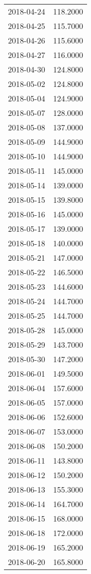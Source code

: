 \begin{tabular}{lr}
2018-04-24 &    118.2000 \\
2018-04-25 &    115.7000 \\
2018-04-26 &    115.6000 \\
2018-04-27 &    116.0000 \\
2018-04-30 &    124.8000 \\
2018-05-02 &    124.8000 \\
2018-05-04 &    124.9000 \\
2018-05-07 &    128.0000 \\
2018-05-08 &    137.0000 \\
2018-05-09 &    144.9000 \\
2018-05-10 &    144.9000 \\
2018-05-11 &    145.0000 \\
2018-05-14 &    139.0000 \\
2018-05-15 &    139.8000 \\
2018-05-16 &    145.0000 \\
2018-05-17 &    139.0000 \\
2018-05-18 &    140.0000 \\
2018-05-21 &    147.0000 \\
2018-05-22 &    146.5000 \\
2018-05-23 &    144.6000 \\
2018-05-24 &    144.7000 \\
2018-05-25 &    144.7000 \\
2018-05-28 &    145.0000 \\
2018-05-29 &    143.7000 \\
2018-05-30 &    147.2000 \\
2018-06-01 &    149.5000 \\
2018-06-04 &    157.6000 \\
2018-06-05 &    157.0000 \\
2018-06-06 &    152.6000 \\
2018-06-07 &    153.0000 \\
2018-06-08 &    150.2000 \\
2018-06-11 &    143.8000 \\
2018-06-12 &    150.2000 \\
2018-06-13 &    155.3000 \\
2018-06-14 &    164.7000 \\
2018-06-15 &    168.0000 \\
2018-06-18 &    172.0000 \\
2018-06-19 &    165.2000 \\
2018-06-20 &    165.8000 \\

\end{tabular}

